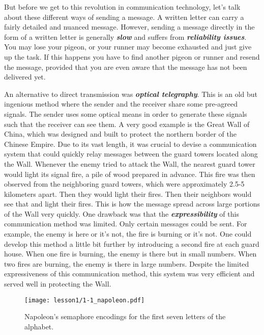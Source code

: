 But before we get to this revolution in communication technology, let's talk about these different ways of sending a message. A written letter can carry a fairly detailed and nuanced message.
However, sending a message directly in the form of a written letter is generally \textit{\textbf{slow}} and suffers from \textit{\textbf{reliability issues}}.
You may lose your pigeon, or your runner may become exhausted and just give up the task.
If this happens you have to find another pigeon or runner and resend the message, provided that you are even aware that the message has not been delivered yet.

An alternative to direct transmission was \textit{\textbf{optical telegraphy}}.
This is an old but ingenious method where the sender and the receiver share some pre-agreed signals.
The sender uses some optical means in order to generate these signals such that the receiver can see them.
A very good example is the Great Wall of China, which was designed and built to protect the northern border of the Chinese Empire.
Due to its vast length, it was crucial to devise a communication system that could quickly relay messages between the guard towers located along the Wall.
Whenever the enemy tried to attack the Wall, the nearest guard tower would light its signal fire, a pile of wood prepared in advance. This fire was then observed from the neighboring guard towers, which were approximately 2.5-5 kilometers apart.
Then they would light their fires.
Then their neighbors would see that and light their fires.
This is how the message spread across large portions of the Wall very quickly.
One drawback was that the \textit{\textbf{expressibility}} of this communication method was limited.
Only certain messages could be sent.
For example, the enemy is here or it's not, the fire is burning or it's not.
One could develop this method a little bit further by introducing a second fire at each guard house.
When one fire is burning, the enemy is there but in small numbers.
When two fires are burning, the enemy is there in large numbers.
Despite the limited expressiveness of this communication method, this system was very efficient and served well in protecting the Wall.

\begin{figure}[t]
    \centering
    \texttt{[image: lesson1/1-1\_napoleon.pdf]}
    \caption[Napoleon's semaphore]{Napoleon's semaphore encodings for the first seven letters of the alphabet.}
    \label{fig:1-1_napoleon}
\end{figure}

